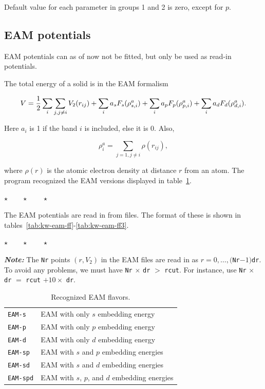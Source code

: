 \documentclass[a4paper,12pt,pdftex,onecolumn]{article}
\newcommand{\stars}{\begin{center}%
\vspace{1em plus 0.5em minus 0.5em}%
$\star \qquad \star \qquad \star$%
\vspace{1em plus 0.5em minus 0.5em}%
\end{center}}
\begin{document}
Default value for each parameter in groups 1 and 2 is zero, except for
$p$.



\subsection{EAM potentials}

EAM potentials can as of now not be fitted, but only be used
as read-in potentials.

The total energy of a solid is in the EAM formalism

\begin{equation}
V = {1 \over 2} \sum_i \sum_{j, j \neq i} V_2(r_{ij})
+ \sum_i a_s F_s(\rho^a_{s,i})
+ \sum_i a_p F_p(\rho^a_{p,i})
+ \sum_i a_d F_d(\rho^a_{d,i}).
\end{equation}

Here $a_i$ is 1 if the band $i$ is included, else it is 0.
Also,

\begin{equation}
\rho^a_i = \sum_{j=1, j\neq i} \rho(r_{ij}),
\end{equation}

where $\rho(r)$ is the atomic electron density at distance $r$
from an atom. The program recognized the EAM versions displayed
in table~\ref{tab:kw-eam}.

\stars



The EAM potentials are read in from files. The format of these
is shown in tables~\ref{tab:kw-eam-ff}-\ref{tab:kw-eam-ff3}.

\stars

{\large \textit{\textbf{Note:}}} The \verb+Nr+ points $(r, V_2)$
in the EAM files are read in as
$r = 0, \ldots,($\verb+Nr+$-1)$\verb+dr+.
To avoid any problems, we must have \verb+Nr+ $\times$ \verb+dr+ $>$ \verb+rcut+.
For instance, use 
\verb+Nr+ $\times$ \verb+dr+ $=$ \verb+rcut+ $+ 10 \times$ \verb+dr+.



\begin{table}[!h]
\caption{
Recognized EAM flavors.
\label{tab:kw-eam}
}
\begin{center}
\begin{tabular}{|l|l|}
\hline
\hline
\verb+EAM-s+         & EAM with only $s$ embedding energy \\
\verb+EAM-p+         & EAM with only $p$ embedding energy \\
\verb+EAM-d+         & EAM with only $d$ embedding energy \\
\verb+EAM-sp+        & EAM with $s$ and $p$ embedding energies \\
\verb+EAM-sd+        & EAM with $s$ and $d$ embedding energies \\
\verb+EAM-spd+       & EAM with $s$, $p$, and $d$ embedding energies \\
\hline
\hline
\end{tabular}
\end{center}
\end{table}
\end{document}
